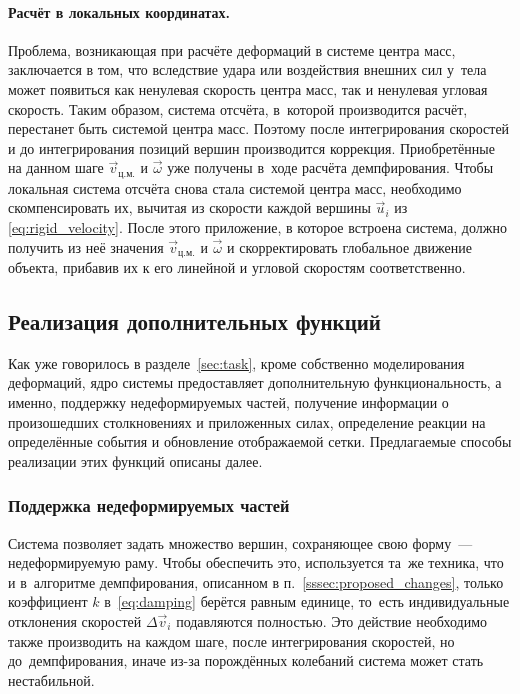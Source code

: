 \documentclass[a4paper, 14pt, titlepage]{extarticle}
\newcommand{\vect}[1]{\vec{#1}} %
\begin{document}
        \paragraph{Расчёт в локальных координатах.} Проблема, возникающая при расчёте деформаций в
        системе центра масс, заключается в том, что вследствие удара или воздействия внешних сил
        у~тела может появиться как ненулевая скорость центра масс, так и ненулевая угловая скорость.
        Таким образом, система отсчёта, в~которой производится расчёт, перестанет быть системой центра
        масс. Поэтому после интегрирования скоростей и до интегрирования позиций вершин производится
        коррекция. Приобретённые на данном шаге $\vect{v}_{ц.м.}$ и $\vect{\omega}$ уже получены
        в~ходе расчёта демпфирования. Чтобы локальная система отсчёта снова стала системой центра масс,
        необходимо скомпенсировать их, вычитая из скорости каждой вершины $\vect{u}_i$ из \eqref{eq:rigid_velocity}.
        После этого приложение, в которое встроена система, должно получить из неё значения
        $\vect{v}_{ц.м.}$ и $\vect{\omega}$ и скорректировать глобальное движение объекта, прибавив их
        к его линейной и угловой скоростям соответственно.

    \subsection{Реализация дополнительных функций}

      Как уже говорилось в разделе~\ref{sec:task}, кроме собственно моделирования деформаций, ядро
      системы предоставляет дополнительную функциональность, а именно, поддержку недеформируемых
      частей, получение информации о произошедших столкновениях и приложенных силах, определение
      реакции на определённые события и обновление отображаемой сетки. Предлагаемые способы
      реализации этих функций описаны далее.

      \subsubsection{Поддержка недеформируемых частей}

        Система позволяет задать множество вершин, сохраняющее свою форму~--- недеформируемую раму.
        Чтобы обеспечить это, используется та~же техника, что и в~алгоритме демпфирования,
        описанном в п.~\ref{sssec:proposed_changes}, только коэффициент $k$ в~\eqref{eq:damping}
        берётся равным единице, то~есть индивидуальные отклонения скоростей $\Delta \vect{v}_i$
        подавляются полностью. Это действие необходимо также производить на каждом шаге, после
        интегрирования скоростей, но до~демпфирования, иначе из-за порождённых колебаний система
        может стать нестабильной.
\end{document}
